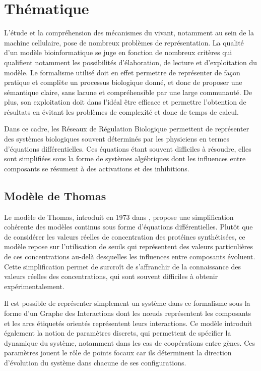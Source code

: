 \chapter{Thématique}


L'étude et la compréhension des mécanismes du vivant, notamment au sein de la machine cellulaire, pose de nombreux problèmes de représentation.
La qualité d'un modèle bioinformatique se juge en fonction de nombreux critères qui qualifient notamment les possibilités d'élaboration, de lecture et d'exploitation du modèle.
Le formalisme utilisé doit en effet permettre de représenter de façon pratique et complète un processus biologique donné, et donc
de proposer une sémantique claire, sans lacune et compréhensible par une large communauté.
De plus, son exploitation doit dans l'idéal être efficace et permettre l'obtention de résultats en évitant les problèmes de complexité et donc de temps de calcul.

Dans ce cadre, les Réseaux de Régulation Biologique permettent de représenter des systèmes biologiques souvent déterminés par les physiciens en termes d'équations différentielles.
Ces équations étant souvent difficiles à résoudre, elles sont simplifiées sous la forme de systèmes algébriques dont les influences entre composants se résument à des activations et des inhibitions.

\section{Modèle de Thomas}
Le modèle de Thomas, introduit en 1973 dans \cite{Thomas73}, propose une simplification cohérente des modèles continus sous forme d'équations différentielles.
Plutôt que de considérer les valeurs réelles de concentration des protéines synthétisées, ce modèle repose sur l'utilisation de seuils qui représentent des valeurs particulières de ces concentrations au-delà desquelles les influences entre composants évoluent.
Cette simplification permet de surcroît de s'affranchir de la connaissance des valeurs réelles des concentrations, qui sont souvent difficiles à obtenir expérimentalement.

Il est possible de représenter simplement un système dans ce formalisme sous la forme d'un Graphe des Interactions dont les nœuds représentent les composants et les arcs étiquetés orientés représentent leurs interactions.
Ce modèle introduit également la notion de paramètres discrets, qui permettent de spécifier la dynamique du système, notamment dans les cas de coopérations entre gènes.
Ces paramètres jouent le rôle de points focaux car ils déterminent la direction d'évolution du système dans chacune de ses configurations.

